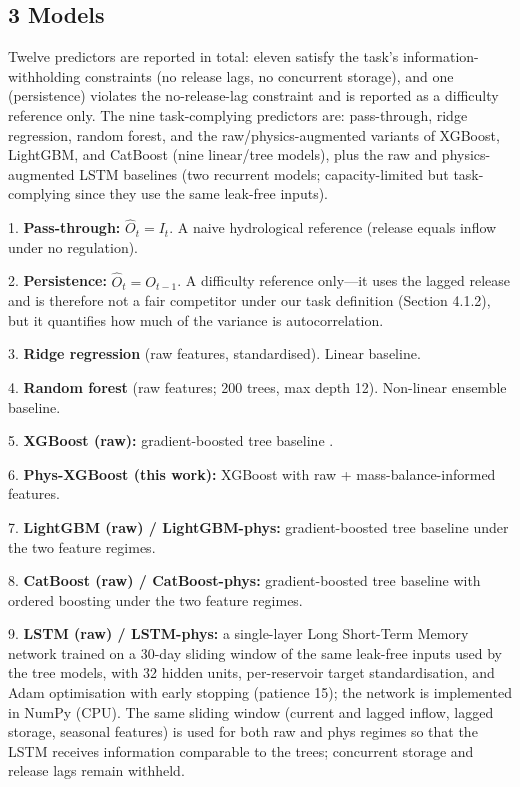 \documentclass[journal]{ascelike-new}
\begin{document}
\subsection{3 Models}


Twelve predictors are reported in total: eleven satisfy the task's information-withholding constraints (no release lags, no concurrent storage), and one (persistence) violates the no-release-lag constraint and is reported as a difficulty reference only. The nine task-complying predictors are: pass-through, ridge regression, random forest, and the raw/physics-augmented variants of XGBoost, LightGBM, and CatBoost (nine linear/tree models), plus the raw and physics-augmented LSTM baselines (two recurrent models; capacity-limited but task-complying since they use the same leak-free inputs).


1. \textbf{Pass-through:} $\hat{O}_t = I_t$. A naive hydrological reference (release equals inflow under no regulation).

2. \textbf{Persistence:} $\hat{O}_t = O_{t-1}$. A difficulty reference only---it uses the lagged release and is therefore not a fair competitor under our task definition (Section 4.1.2), but it quantifies how much of the variance is autocorrelation.

3. \textbf{Ridge regression} (raw features, standardised). Linear baseline.

4. \textbf{Random forest} (raw features; 200 trees, max depth 12). Non-linear ensemble baseline.

5. \textbf{XGBoost (raw):} gradient-boosted tree baseline \citep{Chen2016}.

6. \textbf{Phys-XGBoost (this work):} XGBoost with raw + mass-balance-informed features.

7. \textbf{LightGBM (raw) / LightGBM-phys:} gradient-boosted tree baseline \citep{Ke2017} under the two feature regimes.

8. \textbf{CatBoost (raw) / CatBoost-phys:} gradient-boosted tree baseline with ordered boosting \citep{Prokhorenkova2018} under the two feature regimes.

9. \textbf{LSTM (raw) / LSTM-phys:} a single-layer Long Short-Term Memory network \citep{Hochreiter1997} trained on a 30-day sliding window of the same leak-free inputs used by the tree models, with 32 hidden units, per-reservoir target standardisation, and Adam optimisation with early stopping (patience 15); the network is implemented in NumPy (CPU). The same sliding window (current and lagged inflow, lagged storage, seasonal features) is used for both raw and phys regimes so that the LSTM receives information comparable to the trees; concurrent storage and release lags remain withheld.
\end{document}

